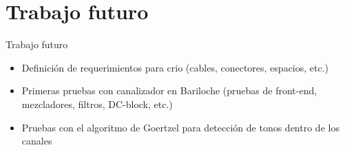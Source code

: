 \documentclass[ignorenonframetext,12pt]{beamer}
\begin{document}
\section{Trabajo futuro}
\begin{frame}{Trabajo futuro}
				\begin{itemize}
								\item Definici\'on de requerimientos para crio (cables,
												conectores, espacios, etc.)
								\item Primeras pruebas con canalizador en Bariloche (pruebas de
												front-end, mezcladores, filtros, DC-block, etc.)
								\item Pruebas con el algoritmo de Goertzel para detección de
												tonos dentro de los canales
				\end{itemize}
\end{frame}
\end{document}
